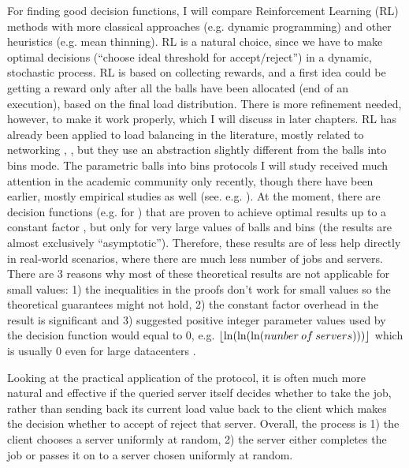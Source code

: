 For finding good decision functions, I will compare Reinforcement Learning (RL) methods with more classical approaches (e.g. dynamic programming) and other heuristics (e.g. mean thinning). RL is a natural choice, since we have to make optimal decisions (``choose ideal threshold for accept/reject'') in a dynamic, stochastic process. RL is based on collecting rewards, and a first idea could be getting a reward only after all the balls have been allocated (end of an execution), based on the final load distribution. There is more refinement needed, however, to make it work properly, which I will discuss in later chapters. RL has already been applied to load balancing in the literature, mostly related to networking \cite{attiah2020RLcellular}, \cite{yeo2021controller}, but they use an abstraction slightly different from the balls into bins mode. The parametric balls into bins protocols I will study received much attention in the academic community only recently, though there have been earlier, mostly empirical studies as well (see. e.g. \cite{derek1986twothinningfirstattempt}). At the moment, there are decision functions (e.g. for \TwoThinning) that are proven to achieve optimal results up to a constant factor \cite{feldheim2021thinning}, but only for very large values of balls and bins (the results are almost exclusively ``asymptotic''). Therefore, these results are of less help directly in real-world scenarios, where there are much less number of jobs and servers. There are $3$ reasons why most of these theoretical results are not applicable for small values: 1) the inequalities in the proofs don't work for small values \cite{feldheim2021longtermthinning} so the theoretical guarantees might not hold, 2) the constant factor overhead in the result is significant and 3) suggested positive integer parameter values used by the decision function would equal to $0$, e.g. $\lfloor\ln(\ln(\ln(nunber\: of \: servers)))\rfloor$ which is usually $0$ even for large datacenters \cite{uzaman2019datacentersize}.



Looking at the practical application of the \TwoThinning protocol, it is often much more natural and effective if the queried server itself decides whether to take the job, rather than sending back its current load value back to the client which makes the decision whether to accept of reject that server.  Overall, the process is 1) the client chooses a server uniformly at random, 2) the server either completes the job or passes it on to a server chosen uniformly at random.

